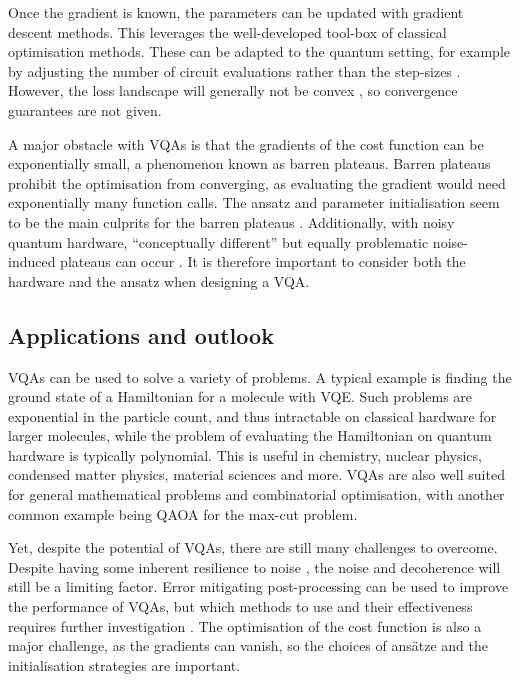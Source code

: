 Once the gradient is known, the parameters can be updated with gradient descent methods.
This leverages the well-developed tool-box of classical optimisation methods.
These can be adapted to the quantum setting, for example by adjusting the number of circuit evaluations rather than the step-sizes \cite{cerezo2021}.
However, the loss landscape will generally not be convex \cite{huembeli2021}, so convergence guarantees are not given.

A major obstacle with VQAs is that the gradients of the cost function can be exponentially small, a phenomenon known as barren plateaus.
Barren plateaus prohibit the optimisation from converging, as evaluating the gradient would need exponentially many function calls.
The ansatz and parameter initialisation seem to be the main culprits for the barren plateaus \cite{mcclean2018, cerezo2021a}.
Additionally, with noisy quantum hardware, \enquote{conceptually different} but equally problematic noise-induced plateaus can occur \cite{wang2021}.
It is therefore important to consider both the hardware and the ansatz when designing a VQA.

\subsection{Applications and outlook}
VQAs can be used to solve a variety of problems.
A typical example is finding the ground state of a Hamiltonian for a molecule with VQE.
Such problems are exponential in the particle count, and thus intractable on classical hardware for larger molecules, while the problem of evaluating the Hamiltonian on quantum hardware is typically polynomial.
This is useful in chemistry, nuclear physics, condensed matter physics, material sciences and more.
VQAs are also well suited for general mathematical problems and combinatorial optimisation, with another common example being QAOA for the max-cut problem.

Yet, despite the potential of VQAs, there are still many challenges to overcome.
Despite having some inherent resilience to noise \cite{cerezo2021}, the noise and decoherence will still be a limiting factor.
Error mitigating post-processing can be used to improve the performance of VQAs, but which methods to use and their effectiveness requires further investigation \cite{endo2021}.
The optimisation of the cost function is also a major challenge, as the gradients can vanish, so the choices of ansätze and the initialisation strategies are important.

